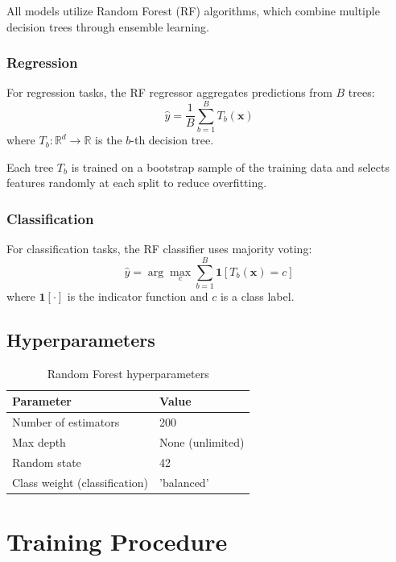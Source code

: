 \documentclass[11pt,a4paper]{article}
\begin{document}
All models utilize Random Forest (RF) algorithms, which combine multiple decision trees through ensemble learning.

\subsubsection{Regression}

For regression tasks, the RF regressor aggregates predictions from $B$ trees:
\begin{equation}
\hat{y} = \frac{1}{B} \sum_{b=1}^{B} T_b(\mathbf{x})
\end{equation}
where $T_b: \mathbb{R}^{d} \rightarrow \mathbb{R}$ is the $b$-th decision tree.

Each tree $T_b$ is trained on a bootstrap sample of the training data and selects features randomly at each split to reduce overfitting.

\subsubsection{Classification}

For classification tasks, the RF classifier uses majority voting:
\begin{equation}
\hat{y} = \arg\max_{c} \sum_{b=1}^{B} \mathbf{1}[T_b(\mathbf{x}) = c]
\end{equation}
where $\mathbf{1}[\cdot]$ is the indicator function and $c$ is a class label.

\subsection{Hyperparameters}

\begin{table}[H]
\centering
\begin{tabular}{@{}ll@{}}
\toprule
\textbf{Parameter} & \textbf{Value} \\
\midrule
Number of estimators & 200 \\
Max depth & None (unlimited) \\
Random state & 42 \\
Class weight (classification) & 'balanced' \\
\bottomrule
\end{tabular}
\caption{Random Forest hyperparameters}
\label{tab:hyperparams}
\end{table}

\section{Training Procedure}
\end{document}
